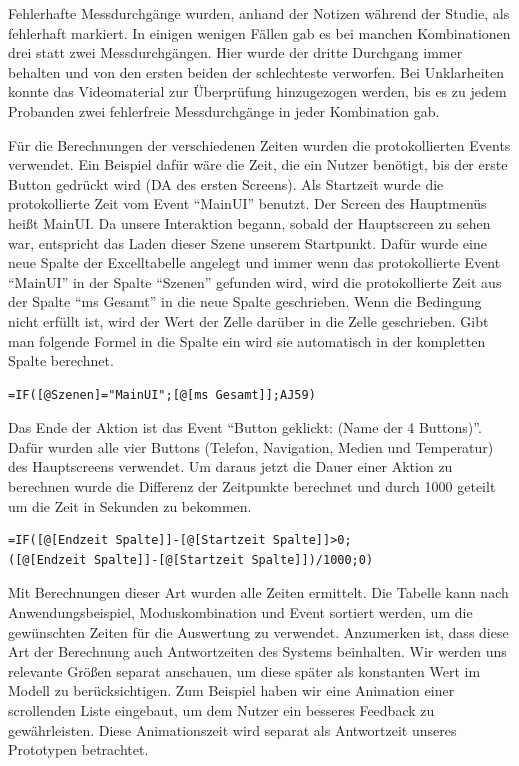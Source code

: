 Fehlerhafte Messdurchgänge wurden, anhand der Notizen während der Studie, als fehlerhaft markiert. 
In einigen wenigen Fällen gab es bei manchen Kombinationen drei statt zwei Messdurchgängen. 
Hier wurde der dritte Durchgang immer behalten und von den ersten beiden der schlechteste verworfen. 
Bei Unklarheiten konnte das Videomaterial zur Überprüfung hinzugezogen werden, bis es zu jedem Probanden zwei fehlerfreie Messdurchgänge in jeder Kombination gab. 

Für die Berechnungen der verschiedenen Zeiten wurden die protokollierten Events verwendet. 
Ein Beispiel dafür wäre die Zeit, die ein Nutzer benötigt, bis der erste Button gedrückt wird (DA des ersten Screens). Als Startzeit wurde die protokollierte Zeit vom Event "`MainUI"' benutzt. 
Der Screen des Hauptmenüs heißt MainUI. Da unsere Interaktion begann, sobald der Hauptscreen zu sehen war, entspricht das Laden dieser Szene unserem Startpunkt. 
Dafür wurde eine neue Spalte der Excelltabelle angelegt und immer wenn das protokollierte Event "`MainUI"' in der Spalte "`Szenen"' gefunden wird, wird die protokollierte Zeit aus der Spalte "`ms Gesamt"' in die neue Spalte geschrieben. 
Wenn die Bedingung nicht erfüllt ist, wird der Wert der Zelle darüber in die Zelle geschrieben. 
Gibt man folgende Formel in die Spalte ein wird sie automatisch in der kompletten Spalte berechnet.  
\begin{lstlisting}
=IF([@Szenen]="MainUI";[@[ms Gesamt]];AJ59)
\end{lstlisting}
Das Ende der Aktion ist das Event "`Button geklickt: (Name der 4 Buttons)"'. 
Dafür wurden alle vier Buttons (Telefon, Navigation, Medien und Temperatur) des Hauptscreens verwendet. 
Um daraus jetzt die Dauer einer Aktion zu berechnen wurde die Differenz der Zeitpunkte berechnet und durch 1000 geteilt um die Zeit in Sekunden zu bekommen.
\begin{lstlisting}
=IF([@[Endzeit Spalte]]-[@[Startzeit Spalte]]>0;
([@[Endzeit Spalte]]-[@[Startzeit Spalte]])/1000;0)
\end{lstlisting}

Mit Berechnungen dieser Art wurden alle Zeiten ermittelt. Die Tabelle kann nach Anwendungsbeispiel, Moduskombination und Event sortiert werden, um die gewünschten Zeiten für die Auswertung zu verwendet. 
Anzumerken ist, dass diese Art der Berechnung auch Antwortzeiten des Systems beinhalten. 
Wir werden uns relevante Größen separat anschauen, um diese später als konstanten Wert im Modell zu berücksichtigen. 
Zum Beispiel haben wir eine Animation einer scrollenden Liste eingebaut, um dem Nutzer ein besseres Feedback zu gewährleisten. 
Diese Animationszeit wird separat als Antwortzeit unseres Prototypen betrachtet. 

